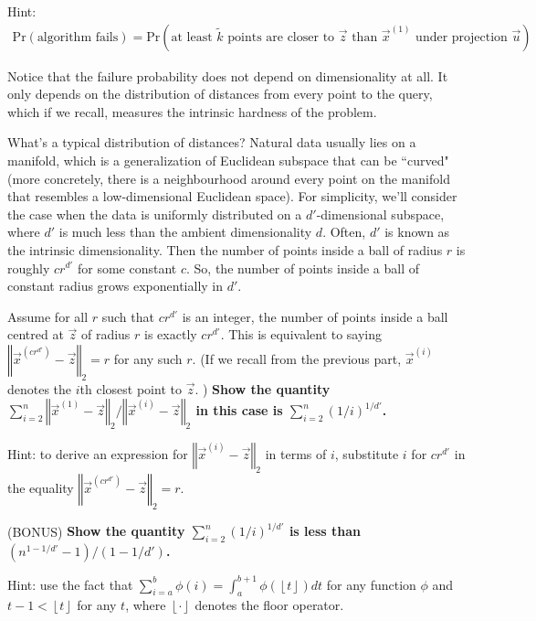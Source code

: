 \documentclass[preview]{standalone}
\begin{document}
\begin{Parts}
Hint: \begin{align*}
\mathrm{Pr}\left(\mbox{algorithm fails}\right) = \mathrm{Pr}\left(\mbox{at least }\tilde{k}\mbox{ points are closer to }\vec{z}\mbox{ than }\vec{x}^{(1)}\mbox{ under projection }\vec{u}\right)
\end{align*}



\Part Notice that the failure probability does not depend on dimensionality at all. It only depends on the distribution of distances from every point to the query, which if we recall, measures the intrinsic hardness of the problem.

What's a typical distribution of distances? Natural data usually lies on a manifold, which is a generalization of Euclidean subspace that can be ``curved" (more concretely, there is a neighbourhood around every point on the manifold that resembles a low-dimensional Euclidean space). For simplicity, we'll consider the case when the data is uniformly distributed on a $d'$-dimensional subspace, where $d'$ is much less than the ambient dimensionality $d$. Often, $d'$ is known as the intrinsic dimensionality. Then the number of points inside a ball of radius $r$ is roughly $cr^{d'}$ for some constant $c$. So, the number of points inside a ball of constant radius grows exponentially in $d'$.

Assume for all $r$ such that $cr^{d'}$ is an integer, the number of points inside a ball centred at $\vec{z}$ of radius $r$ is exactly $cr^{d'}$. This is equivalent to saying $\left\Vert \vec{x}^{(cr^{d'})}-\vec{z}\right\Vert_{2}=r$ for any such $r$. (If we recall from the previous part, $\vec{x}^{(i)}$ denotes the $i$th closest point to $\vec{z}$. ) {\bf Show the quantity \\
$\sum_{i=2}^{n}\left\Vert \vec{x}^{(1)}-\vec{z}\right\Vert _{2}/\left\Vert \vec{x}^{(i)}-\vec{z}\right\Vert _{2}$ in this case is $\sum_{i=2}^{n}\left(1/i\right)^{1/d'}$.}

Hint: to derive an expression for $\left\Vert \vec{x}^{(i)}-\vec{z}\right\Vert _{2}$ in terms of $i$, substitute $i$ for $cr^{d'}$ in the equality $\left\Vert \vec{x}^{(cr^{d'})}-\vec{z}\right\Vert_{2}=r$.



\Part (BONUS) {\bf Show the quantity $\sum_{i=2}^{n}\left(1/i\right)^{1/d'}$ is less than $\left(n^{1-1/d'}-1\right)/\left(1-1/d'\right)$.}

Hint: use the fact that $\sum_{i=a}^{b}\phi(i)=\int_{a}^{b+1}\phi(\left\lfloor t\right\rfloor)dt$ for any function $\phi$ and $t-1<\left\lfloor t\right\rfloor $ for any $t$, where $\left\lfloor \cdot \right\rfloor$ denotes the floor operator.




\end{Parts}
\end{document}
